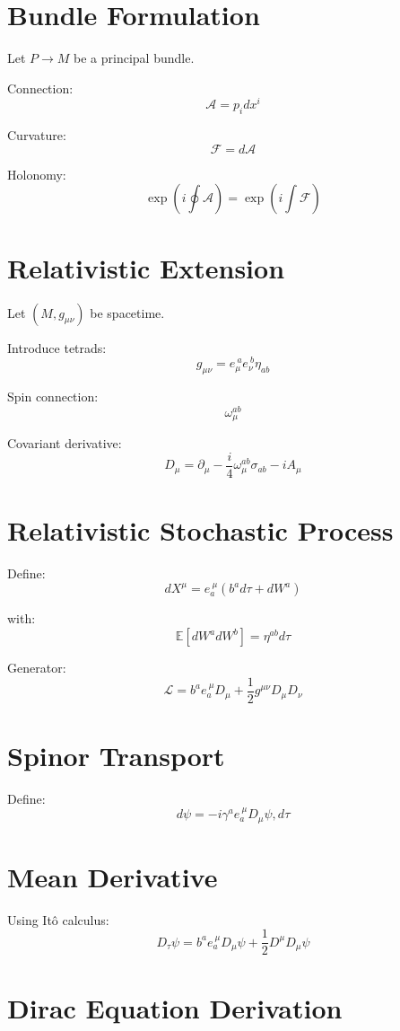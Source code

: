 \documentclass[11pt]{article}
\begin{document}
\section{Bundle Formulation}

Let $P \to M$ be a principal bundle.

Connection:
\[
\mathcal{A} = p_i dx^i
\]

Curvature:
\[
\mathcal{F} = d\mathcal{A}
\]

Holonomy:
\[
\exp(i\oint \mathcal{A}) = \exp(i\int \mathcal{F})
\]

\section{Relativistic Extension}

Let $(M,g_{\mu\nu})$ be spacetime.

Introduce tetrads:
\[
g_{\mu\nu} = e_\mu^{\ a} e_\nu^{\ b} \eta_{ab}
\]

Spin connection:
\[
\omega_\mu^{ab}
\]

Covariant derivative:
\[
D_\mu = \partial_\mu - \frac{i}{4}\omega_\mu^{ab}\sigma_{ab} - i A_\mu
\]

\section{Relativistic Stochastic Process}

Define:
\[
dX^\mu = e_a^{\ \mu}(b^a d\tau + dW^a)
\]

with:
\[
\mathbb{E}[dW^a dW^b] = \eta^{ab} d\tau
\]

Generator:
\[
\mathcal{L} = b^a e_a^{\ \mu} D_\mu + \frac{1}{2} g^{\mu\nu} D_\mu D_\nu
\]

\section{Spinor Transport}

Define:
\[
d\psi = -i \gamma^a e_a^{\ \mu} D_\mu \psi, d\tau
\]

\section{Mean Derivative}

Using It\^o calculus:
\[
D_\tau \psi = b^a e_a^{\ \mu} D_\mu \psi + \frac{1}{2} D^\mu D_\mu \psi
\]

\section{Dirac Equation Derivation}
\end{document}

